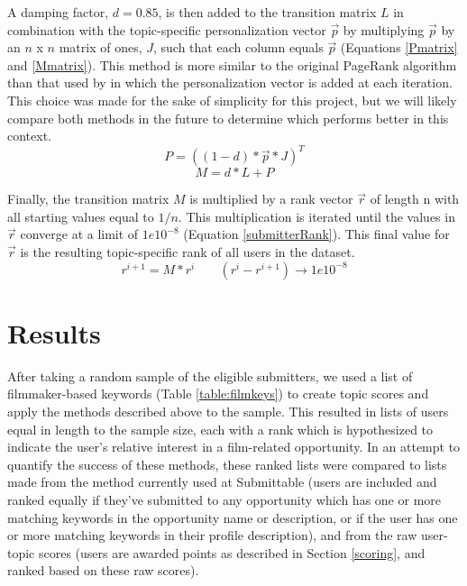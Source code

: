 \documentclass[]{report}   %
\begin{document}
A damping factor, $d = 0.85$, is then added to the transition matrix $L$ in combination with the topic-specific personalization vector $\vec{p}$ by multiplying $\vec{p}$ by an $n$ x $n$ matrix of ones, $J$, such that each column equals $\vec{p}$ (Equations \ref{Pmatrix} and \ref{Mmatrix}). This method is more similar to the original PageRank algorithm than that used by  in which the personalization vector is added at each iteration. This choice was made for the sake of simplicity for this project, but we will likely compare both methods in the future to determine which performs better in this context.
\begin{equation}
\label{Pmatrix}
P=((1-d)*\vec{p}*J)^{T}
\end{equation}
\begin{equation}
\label{Mmatrix}
M=d*L+P
\end{equation}

Finally, the transition matrix $M$ is multiplied by a rank vector $\vec{r}$ of length n with all starting values equal to $1/n$. This multiplication is iterated until the values in $\vec{r}$ converge at a limit of $1e10^{-8}$ (Equation \ref{submitterRank}). This final value for $\vec{r}$ is the resulting topic-specific rank of all users in the dataset.
\begin{equation}
\label{submitterRank}
r^{i+1}=M*r^{i} \;\; \;\;\;\;\;(r^{i}-r^{i+1})\rightarrow1e10^{-8}
\end{equation}


\chapter{Results}

After taking a random sample of the eligible submitters, we used a list of filmmaker-based keywords (Table \ref{table:filmkeys}) to create topic scores and apply the methods described above to the sample. This resulted in lists of users equal in length to the sample size, each with a rank which is hypothesized to indicate the user's relative interest in a film-related opportunity. In an attempt to quantify the success of these methods, these ranked lists were compared to lists made from the method currently used at Submittable (users are included and ranked equally if they've submitted to any opportunity which has one or more matching keywords in the opportunity name or description, or if the user has one or more matching keywords in their profile description), and from the raw user-topic scores (users are awarded points as described in Section \ref{scoring}, and ranked based on these raw scores). 
\end{document}
